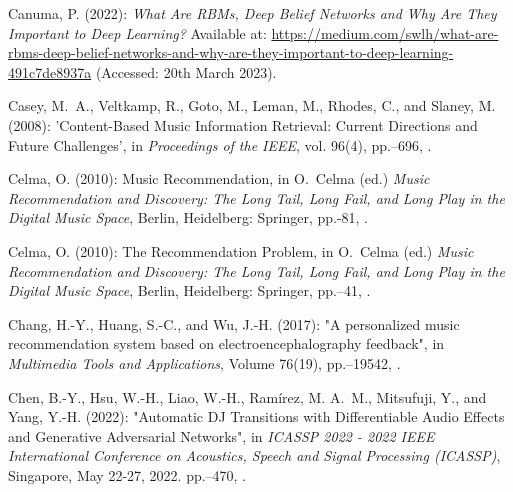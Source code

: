 \documentclass[11pt,titlepage,oneside]{book}
\begin{document}
\begin{thebibliography}{97}
	Canuma, P. (2022): \textit{What Are RBMs, Deep Belief Networks and Why Are They Important to Deep Learning?} Available at: \url{https://medium.com/swlh/what-are-rbms-deep-belief-networks-and-why-are-they-important-to-deep-learning-491c7de8937a} 
	(Accessed: 20th March 2023).
	
	Casey, M.~A., Veltkamp, R., Goto, M., Leman, M., Rhodes, C., and Slaney, M.
	(2008): 'Content-{Based} {Music} {Information} {Retrieval}: {Current}
		{Directions} and {Future} {Challenges}', in \textit{Proceedings of the IEEE},
	vol. 96(4), pp.--696, . 
	
	Celma, O. (2010{}): Music Recommendation, in
	O.~Celma (ed.) \textit{Music {Recommendation} and {Discovery}: {The} {Long}
		{Tail}, {Long} {Fail}, and {Long} {Play} in the {Digital} {Music} {Space}},
	Berlin, Heidelberg: Springer, pp.-81,
	.
	
	Celma, O. (2010{}): The {Recommendation} {Problem}, in
	O.~Celma (ed.) \textit{Music {Recommendation} and {Discovery}: {The} {Long}
		{Tail}, {Long} {Fail}, and {Long} {Play} in the {Digital} {Music} {Space}},
	Berlin, Heidelberg: Springer, pp.--41,
	.
	
	Chang, H.-Y., Huang, S.-C., and Wu, J.-H. (2017): "A personalized music
		recommendation system based on electroencephalography feedback", in
	\textit{Multimedia Tools and Applications}, Volume 76(19), pp.--19542, .
	
	Chen, B.-Y., Hsu, W.-H., Liao, W.-H., Ramírez, M. A.~M., Mitsufuji, Y., and
	Yang, Y.-H. (2022): "Automatic {DJ} {Transitions} with
		{Differentiable} {Audio} {Effects} and {Generative} {Adversarial}
		{Networks}", in \textit{{ICASSP} 2022 - 2022 {IEEE} {International}
		{Conference} on {Acoustics}, {Speech} and {Signal} {Processing} ({ICASSP})}, Singapore, May 22-27, 2022.
	pp.--470, .
	

\end{thebibliography}
\end{document}

